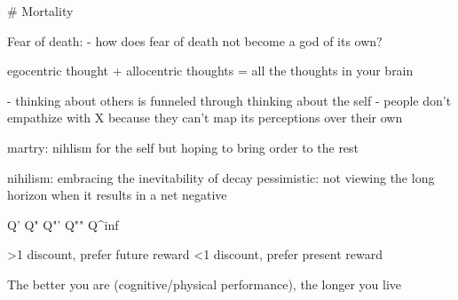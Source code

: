 \# Mortality

Fear of death:
- how does fear of death not become a god of its own?

egocentric thought + allocentric thoughts = all the thoughts in your brain

- thinking about others is funneled through thinking about the self
    - people don't empathize with X because they can't map its perceptions over their own

martry: nihlism for the self but hoping to bring order to the rest

nihilism: embracing the inevitability of decay
pessimistic: not viewing the long horizon when it results in a net negative


Q' Q" Q"' Q"" Q^inf

>1 discount, prefer future reward
<1 discount, prefer present reward

The better you are (cognitive/physical performance), the longer you live